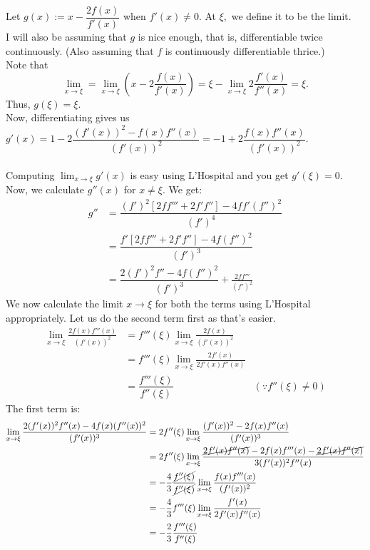 \documentclass{article}
\begin{document}
\begin{enumerate}
	Let $g(x) := x - \dfrac{2f(x)}{f'(x)}$ when $f'(x) \neq 0.$ At $\xi,$ we define it to be the limit.\\
	I will also be assuming that $g$ is nice enough, that is, differentiable twice continuously. (Also assuming that $f$ is continuously differentiable thrice.)\\
	Note that 
	\[\lim_{x\to \xi} = \lim_{x\to \xi}\left(x - 2\frac{f(x)}{f'(x)}\right) = \xi - \lim_{x \to \xi}2\frac{f'(x)}{f''(x)} = \xi.\]
	Thus, $g(\xi) = \xi.$\\
	Now, differentiating gives us $g'(x) = 1 - 2\dfrac{(f'(x))^2 - f(x)f''(x)}{(f'(x))^2} = -1 + 2\dfrac{f(x)f''(x)}{(f'(x))^2}.$\\~\\
	Computing $\displaystyle\lim_{x\to \xi}g'(x)$ is easy using L'Hospital and you get $g'(\xi) = 0.$\\
	Now, we calculate $g''(x)$ for $x \neq \xi.$ We get:
	\begin{align*} 
	g'' 	&= \dfrac{(f')^2[2ff''' + 2f'f''] - 4ff'(f'')^2}{(f')^4} \\
			&= \dfrac{f'[2ff''' + 2f'f''] - 4f(f'')^2}{(f')^3}\\
			&= \dfrac{2(f')^2f'' - 4f(f'')^2}{(f')^3} + \frac{2ff'''}{(f')^2}	
	\end{align*}
	We now calculate the limit $x \to \xi$ for both the terms using L'Hospital appropriately. Let us do the second term first as that's easier.
	\begin{align*} 
		\lim_{x\to \xi}\frac{2f(x)f'''(x)}{(f'(x))^2} &= f'''(\xi)\lim_{x\to \xi}\frac{2f(x)}{(f'(x))^2}\\
		&= f'''(\xi)\lim_{x\to \xi}\frac{2f'(x)}{2f'(x)f''(x)}\\
		&= \dfrac{f'''(\xi)}{f''(\xi)} & (\because f''(\xi) \neq 0)
	\end{align*}
	The first term is:
	\begin{align*} 
		\lim_{x\to \xi}\dfrac{2(f'(x))^2f''(x) - 4f(x)(f''(x))^2}{(f'(x))^3} &= 2f''(\xi)\lim_{x\to \xi}\frac{(f'(x))^2 - 2f(x)f''(x)}{(f'(x))^3}\\
		&= 2f''(\xi)\lim_{x\to \xi}\frac{\cancel{2f'(x)f''(x)} - 2f(x)f'''(x) - \cancel{2f'(x)f''(x)}}{3(f'(x))^2f''(x)}\\
		&= -\frac{4}{3}\frac{\cancel{f''(\xi)}}{\cancel{f''(\xi)}}\lim_{x\to \xi}\frac{f(x)f'''(x)}{(f'(x))^2}\\
		&= -\frac{4}{3}f'''(\xi)\lim_{x\to \xi} \frac{f'(x)}{2f'(x)f''(x)}\\
		&= -\frac{2}{3}\frac{f'''(\xi)}{f''(\xi)}

\end{align*}
\end{enumerate}
\end{document}
